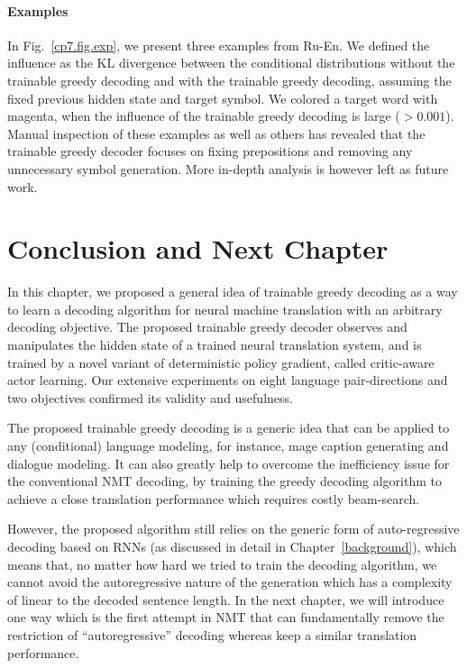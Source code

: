 \paragraph{Examples} 

In Fig.~\ref{cp7.fig.exp}, we present three examples from Ru-En. We defined the influence as the KL divergence between the conditional distributions without the trainable greedy decoding and with the trainable greedy decoding, assuming the fixed previous hidden state and target symbol. We colored a target word with magenta, when the influence of the trainable greedy decoding is large ($> 0.001$).  Manual inspection of these examples as well as others has revealed that the trainable greedy decoder focuses on fixing prepositions and removing any unnecessary symbol generation. More in-depth analysis is however left as future work. 




\section{Conclusion and Next Chapter}
In this chapter, we proposed a general idea of trainable greedy decoding as a way to learn a decoding algorithm for neural machine translation with an arbitrary decoding objective. The proposed trainable greedy decoder observes and manipulates the hidden state of a trained neural translation system, and is trained by a novel variant of deterministic policy gradient, called critic-aware actor learning. 
Our extensive experiments on eight language pair-directions and two objectives confirmed its validity and usefulness. 

The proposed trainable greedy decoding is a generic idea that can be applied to any (conditional) language modeling, for instance, mage caption generating and dialogue modeling. It can also greatly help to overcome the inefficiency issue for the conventional NMT decoding, by training the greedy decoding algorithm to achieve a close translation performance which requires costly beam-search.

However, the proposed algorithm still relies on the generic form of auto-regressive decoding based on RNNs (as discussed in detail in Chapter~\ref{background}), which means that, no matter how hard we tried to train the decoding algorithm, we cannot avoid the autoregressive nature of the generation which has a complexity of linear to the decoded sentence length. In the next chapter, we will introduce one way which is the first attempt in NMT that can fundamentally remove the restriction of ``autoregressive'' decoding whereas keep a similar translation performance.

